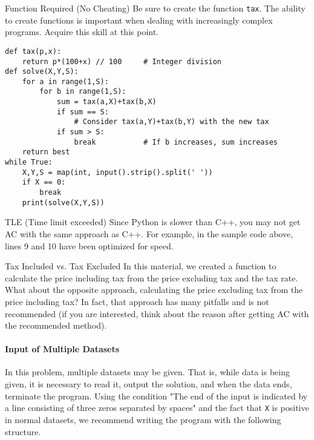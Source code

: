 \begin{warningbox}{Function Required (No Cheating)}
  Be sure to create the function \texttt{tax}. The ability to create functions is important when dealing with increasingly complex programs. Acquire this skill at this point.
\end{warningbox}

\begin{pybox}[emph={break}]
\begin{verbatim}
def tax(p,x):
    return p*(100+x) // 100     # Integer division
def solve(X,Y,S):
    for a in range(1,S):
        for b in range(1,S):
            sum = tax(a,X)+tax(b,X)
            if sum == S:
                # Consider tax(a,Y)+tax(b,Y) with the new tax
            if sum > S:
                break           # If b increases, sum increases
    return best
while True:
    X,Y,S = map(int, input().strip().split(' '))
    if X == 0:
        break
    print(solve(X,Y,S))
\end{verbatim}
\end{pybox}

\begin{debugbox}{TLE (Time limit exceeded)}
  Since Python is slower than C++, you may not get AC with the same approach as C++. For example, in the sample code above, lines 9 and 10 have been optimized for speed.
\end{debugbox}

\begin{warningbox}{Tax Included vs. Tax Excluded}
  In this material, we created a function to calculate the price including tax from the price excluding tax and the tax rate. What about the opposite approach, calculating the price excluding tax from the price including tax? In fact, that approach has many pitfalls and is not recommended (if you are interested, think about the reason after getting AC with the recommended method).
\end{warningbox}

\paragraph{Input of Multiple Datasets}
In this problem, multiple datasets may be given. That is, while data is being given, it is necessary to read it, output the solution, and when the data ends, terminate the program. Using the condition "The end of the input is indicated by a line consisting of three zeros separated by spaces" and the fact that \texttt{X} is positive in normal datasets, we recommend writing the program with the following structure.

